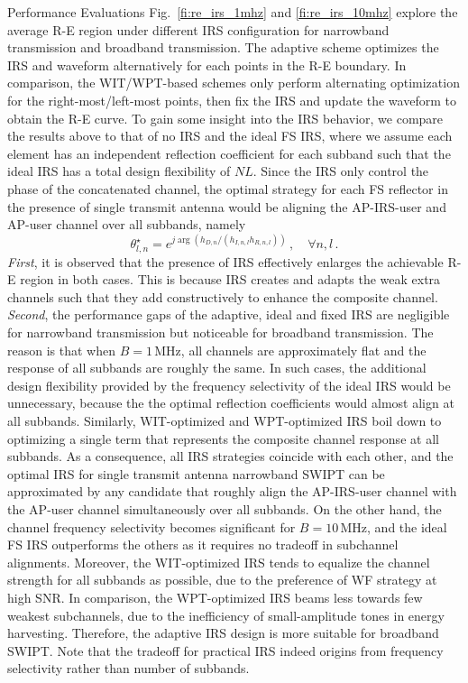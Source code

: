 \documentclass[journal]{IEEEtran}
\begin{document}
\begin{section}{Performance Evaluations}
		Fig.~\ref{fi:re_irs_1mhz} and \ref{fi:re_irs_10mhz} explore the average R-E region under different IRS configuration for narrowband transmission and broadband transmission. The adaptive scheme optimizes the IRS and waveform alternatively for each points in the R-E boundary. In comparison, the WIT/WPT-based schemes only perform alternating optimization for the right-most/left-most points, then fix the IRS and update the waveform to obtain the R-E curve. To gain some insight into the IRS behavior, we compare the results above to that of no IRS and the ideal FS IRS, where we assume each element has an independent reflection coefficient for each subband such that the ideal IRS has a total design flexibility of $NL$. Since the IRS only control the phase of the concatenated channel, the optimal strategy for each FS reflector in the presence of single transmit antenna would be aligning the AP-IRS-user and AP-user channel over all subbands, namely
		\begin{equation}
			\theta_{l,n}^{\star}=e^{j\arg{\left(h_{D,n}/(h_{I,n,l}h_{R,n,l})\right)}}\,,\quad \forall n,l\,.
		\end{equation}
		\textit{First}, it is observed that the presence of IRS effectively enlarges the achievable R-E region in both cases. This is because IRS creates and adapts the weak extra channels such that they add constructively to enhance the composite channel. \textit{Second}, the performance gaps of the adaptive, ideal and fixed IRS are negligible for narrowband transmission but noticeable for broadband transmission. The reason is that when $B=1\,\si{\MHz}$, all channels are approximately flat and the response of all subbands are roughly the same. In such cases, the additional design flexibility provided by the frequency selectivity of the ideal IRS would be unnecessary, because the the optimal reflection coefficients would almost align at all subbands. Similarly, WIT-optimized and WPT-optimized IRS boil down to optimizing a single term that represents the composite channel response at all subbands. As a consequence, all IRS strategies coincide with each other, and the optimal IRS for single transmit antenna narrowband SWIPT can be approximated by any candidate that roughly align the AP-IRS-user channel with the AP-user channel simultaneously over all subbands. On the other hand, the channel frequency selectivity becomes significant for $B=10\,\si{\MHz}$, and the ideal FS IRS outperforms the others as it requires no tradeoff in subchannel alignments. Moreover, the WIT-optimized IRS tends to equalize the channel strength for all subbands as possible, due to the preference of WF strategy at high SNR. In comparison, the WPT-optimized IRS beams less towards few weakest subchannels, due to the inefficiency of small-amplitude tones in energy harvesting. Therefore, the adaptive IRS design is more suitable for broadband SWIPT. Note that the tradeoff for practical IRS indeed origins from frequency selectivity rather than number of subbands.
	\end{section}


	
	
\end{document}
